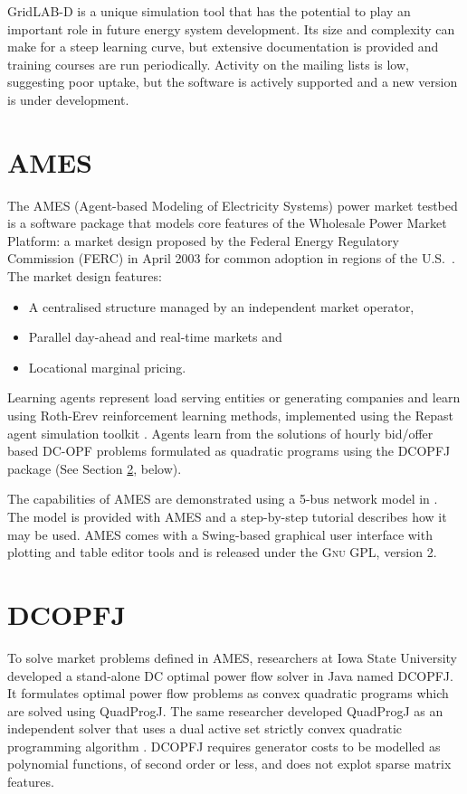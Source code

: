GridLAB-D is a unique simulation tool that has the potential to play an
important role in future energy system development.  Its size and complexity
can make for a steep learning curve, but extensive documentation is provided
and training courses are run periodically.  Activity on the mailing lists is low,
suggesting poor uptake, but the software is actively supported and a new
version is under development.

\section{AMES}
\label{sec:ames}
The AMES (Agent-based Modeling of Electricity Systems) power market testbed is
a software package that models core features of the Wholesale Power Market
Platform: a market design proposed by the Federal Energy Regulatory
Commission (FERC) in April 2003 for common adoption in regions of the
U.S.~\cite{tesfatsi:wpmp}. The market design features:
\begin{itemize}
  \item A centralised structure managed by an independent market operator,
  \item Parallel day-ahead and real-time markets and
  \item Locational marginal pricing.
\end{itemize}
Learning agents represent load serving entities or generating companies and
learn using Roth-Erev reinforcement learning methods,
implemented using the Repast agent simulation toolkit \cite{gieseler:thesis}.
Agents learn from the solutions of hourly bid/offer based
DC-OPF problems formulated as quadratic programs using the DCOPFJ package
\cite{tesfatsi:dcopf} (See Section \ref{sec:dcopfj}, below).

The capabilities of AMES are demonstrated using a 5-bus network model in
.  The model is provided with AMES and a step-by-step
tutorial describes how it may be used.  AMES comes with a
Swing-based graphical user interface with plotting and table editor tools and
is released under the \textsc{Gnu} GPL, version 2.

\section{DCOPFJ}
\label{sec:dcopfj}
To solve market problems defined in AMES, researchers at Iowa State University
developed a stand-alone DC optimal power flow solver in Java named DCOPFJ.
It formulates optimal power flow problems as convex quadratic programs
which are solved using QuadProgJ.  The same researcher developed QuadProgJ as
an independent solver that uses a dual active set strictly convex quadratic
programming algorithm \cite{goldfarb:scqp}.  DCOPFJ requires
generator costs to be modelled as polynomial functions, of second order or
less, and does not explot sparse matrix features.

